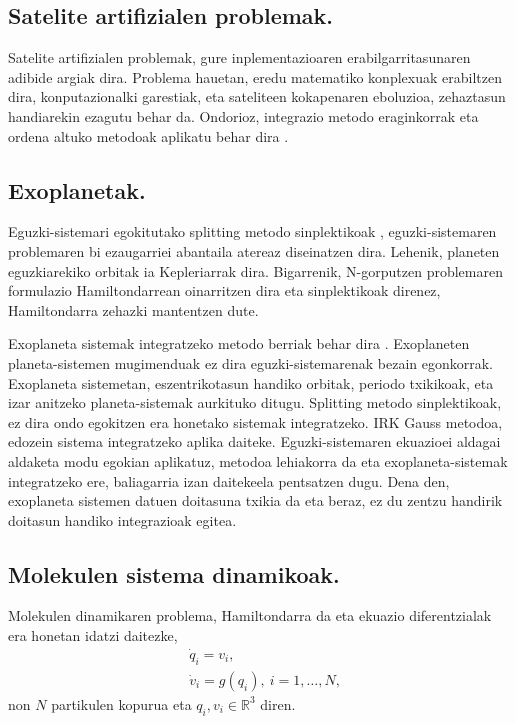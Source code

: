 \subsection*{Satelite artifizialen problemak.}
    
Satelite artifizialen problemak, gure inplementazioaren erabilgarritasunaren adibide argiak dira. Problema hauetan, eredu matematiko konplexuak erabiltzen dira, konputazionalki garestiak, eta sateliteen kokapenaren eboluzioa, zehaztasun handiarekin ezagutu behar da. Ondorioz, integrazio metodo eraginkorrak eta  ordena altuko metodoak aplikatu behar dira \cite{Beylkin2014}.    

\subsection*{Exoplanetak.}

Eguzki-sistemari egokitutako splitting metodo sinplektikoak \cite{Wisdom1991,Laskar2001}, eguzki-sistemaren problemaren bi ezaugarriei abantaila atereaz diseinatzen dira. Lehenik, planeten eguzkiarekiko orbitak ia Kepleriarrak dira. Bigarrenik, N-gorputzen problemaren formulazio Hamiltondarrean oinarritzen dira eta sinplektikoak direnez, Hamiltondarra zehazki mantentzen dute. 

Exoplaneta sistemak integratzeko metodo berriak behar dira \cite{Fabrycky2010}. Exoplaneten planeta-sistemen mugimenduak ez dira eguzki-sistemarenak bezain egonkorrak. Exoplaneta sistemetan, eszentrikotasun handiko orbitak, periodo txikikoak, eta izar anitzeko planeta-sistemak aurkituko ditugu. Splitting metodo sinplektikoak, ez dira ondo egokitzen era honetako sistemak integratzeko.
IRK Gauss metodoa, edozein sistema integratzeko aplika daiteke. Eguzki-sistemaren ekuazioei aldagai aldaketa modu egokian aplikatuz, metodoa lehiakorra da eta exoplaneta-sistemak integratzeko ere,  baliagarria izan daitekeela pentsatzen dugu. Dena den, exoplaneta sistemen datuen doitasuna txikia da  eta beraz, ez du zentzu handirik doitasun handiko integrazioak egitea.         
 
\subsection*{Molekulen sistema dinamikoak.}

Molekulen dinamikaren problema, Hamiltondarra da eta ekuazio diferentzialak era honetan idatzi daitezke,
\begin{align*}
&\dot{q}_i=v_i, \\
&\dot{v}_i=g(q_i), \ i=1,\dots,N,
\end{align*}
non $N$ partikulen kopurua eta $q_i,v_i \in \mathbb{R}^3$ diren.

